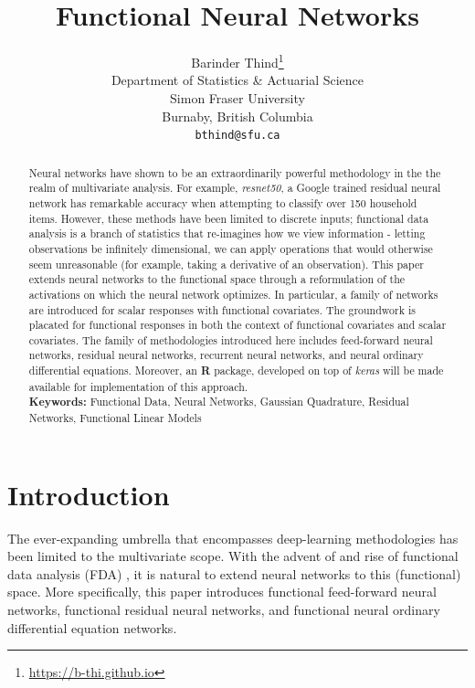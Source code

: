\documentclass{article}
\title{Functional Neural Networks}
\author{
  Barinder Thind\thanks{\url{https://b-thi.github.io}} \\
  Department of Statistics \& Actuarial Science\\
  Simon Fraser University\\
  Burnaby, British Columbia\\
  \texttt{bthind@sfu.ca} \\
}
\begin{document}
\vspace{10em}
\maketitle

\begin{abstract}
\doublespacing
\noindent Neural networks have shown to be an extraordinarily powerful methodology in the the realm of multivariate analysis. For example, \textit{resnet50}, a Google trained residual neural network \cite{resnet} has remarkable accuracy when attempting to classify over 150 household items. However, these methods have been limited to discrete inputs; functional data analysis \cite{fda} is a branch of statistics that re-imagines how we view information - letting observations be infinitely dimensional, we can apply operations that would otherwise seem unreasonable (for example, taking a derivative of an observation). This paper extends neural networks to the functional space through a reformulation of the activations on which the neural network optimizes. In particular, a family of networks are introduced for scalar responses with functional covariates. The groundwork is placated for functional responses in both the context of functional covariates and scalar covariates. The family of methodologies introduced here includes feed-forward neural networks, residual neural networks, recurrent neural networks, and neural ordinary differential equations. Moreover, an \textbf{R} package, developed on top of \textit{keras} will be made available for implementation of this approach.\\

\noindent \textbf{Keywords:} Functional Data, Neural Networks, Gaussian Quadrature, Residual Networks, Functional Linear Models

\end{abstract}
\newpage
\tableofcontents

\newpage
\section{Introduction}
\label{section:one}

\noindent The ever-expanding umbrella that encompasses deep-learning methodologies has been limited to the multivariate scope. With the advent of and rise of functional data analysis (FDA) \cite{fda}, it is natural to extend neural networks to this (functional) space. More specifically, this paper introduces functional feed-forward neural networks, functional residual neural networks, and functional neural ordinary differential equation networks.
\end{document}
